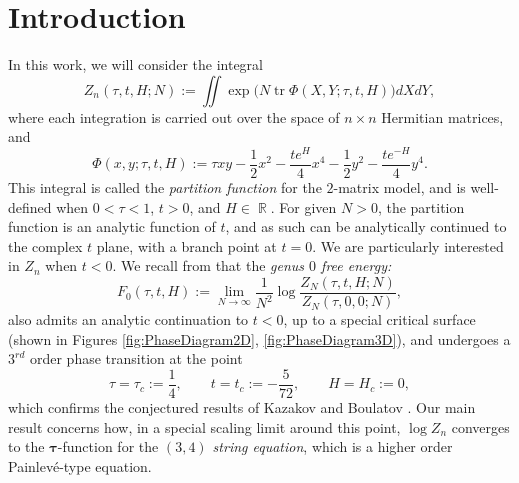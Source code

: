 \documentclass[usenames,dvipsnames]{article}
\theoremstyle{definition}
\DeclareMathOperator{\tr}{tr}
\DeclareMathOperator{\RR}{\mathbb{R}}
\numberwithin{equation}{section}
\numberwithin{figure}{section}
\begin{document}
\section{Introduction}
In this work, we will consider the integral
    \begin{equation}\label{partition-function}
        Z_n(\tau,t,H;N) := \iint \exp \bigg(N \tr \Phi(X,Y;\tau,t,H) \bigg)dXdY,
    \end{equation}
where each integration is carried out over the space of $n\times n$ Hermitian matrices, and
    \begin{equation}
        \Phi(x,y;\tau,t,H):=\tau xy - \frac{1}{2}x^2 - \frac{te^{H}}{4}x^4- \frac{1}{2}y^2 - \frac{te^{-H}}{4}y^4.
    \end{equation}
This integral is called the \textit{partition function} for the $2$-matrix model, and is well-defined when $0<\tau<1$, $t>0$, and $H\in \RR$. For given $N>0$, the partition function is an analytic function of $t$, and as such can be analytically continued to the complex $t$ plane, with a branch point at $t=0$. We are particularly interested in $Z_n$ when $t<0$. We recall from \cite{DHL1} that the \textit{genus $0$ free energy:}
    \begin{equation}
        F_0(\tau,t,H) := \lim_{N\to\infty}\frac{1}{N^2}\log\frac{Z_N(\tau,t,H;N)}{Z_N(\tau,0,0;N)},
    \end{equation}
also admits an analytic continuation to $t<0$, up to a special critical surface (shown in Figures \ref{fig:PhaseDiagram2D}, \ref{fig:PhaseDiagram3D}), and undergoes a $3^{rd}$ order phase transition at the point
    \begin{equation}\label{multicritical-point}
        \tau = \tau_c:= \frac{1}{4}, \qquad t= t_c:=-\frac{5}{72}, \qquad H =H_c:=0,
    \end{equation}
which confirms the conjectured results of Kazakov and Boulatov \cite{Kazakov1,Kazakov2}.
Our main result concerns how, in a special scaling limit around this point, $\log Z_n$ converges to the $\boldsymbol{\tau}$-function for the \textit{$(3,4)$ string equation}, which is a higher order Painlev\'{e}-type equation. 
\end{document}
